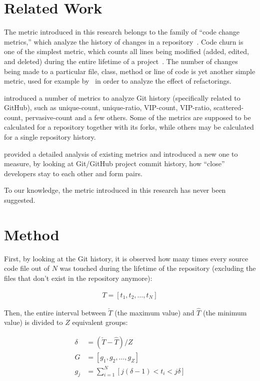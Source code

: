 \documentclass[12pt]{article}
\begin{document}
\section{Related Work}

The metric introduced in this research belongs to the family of
``code change metrics,'' which analyze the history of changes in a repository~\citep{fentonsoftware,choudhary2018}.
Code churn is one of the simplest metric, which counts
all lines being modified (added, edited, and deleted) during
the entire lifetime of a project~\citep{munson1998}.
The number of changes being made to a particular file, class, method
or line of code is yet another simple metric, used for example by~\citet{demeyer2000}
in order to analyze the effect of refactorings.

\citet{biazzini2014} introduced a number of metrics to analyze
Git history (specifically related to GitHub), such as unique-count, unique-ratio,
VIP-count, VIP-ratio, scattered-count, pervasive-count and a few others. Some
of the metrics are supposed to be calculated for a repository together with
its forks, while others may be calculated for a single repository history.

\citet{batista2018} provided a detailed analysis of existing metrics
and introduced a new one to measure, by looking at Git/GitHub project
commit history, how ``close'' developers stay to each other and form
pairs.

To our knowledge, the metric introduced in this research has never been
suggested.

\section{Method}
\label{sec:method}

First, by looking at the Git history,
it is observed how many times every source code file out of $N$ was touched
during the lifetime of the repository (excluding the files that don't exist
in the repository anymore):

\begin{eqnarray}
T = [t_1, t_2, \dots, t_N]
\end{eqnarray}

Then, the entire interval between $\check{T}$ (the maximum value)
and $\hat{T}$ (the minimum value) is divided to $Z$ equivalent groups:

\begin{align}
\delta &= ( \check{T} - \hat{T} ) / Z \\
G &= [g_1, g_2, \dots, g_{Z}] \\
g_j &= \sum_{i=1}^N [ j(\delta-1) < t_i < j\delta ]
\end{align}
\end{document}
